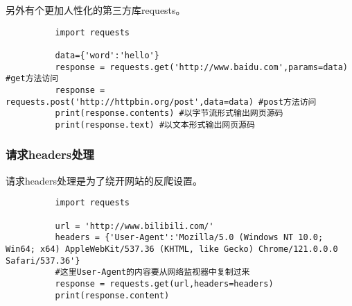 \documentclass{article}
\begin{document}
        另外有个更加人性化的第三方库requests。
        \begin{lstlisting}
          import requests

          data={'word':'hello'}
          response = requests.get('http://www.baidu.com',params=data) #get方法访问
          response = requests.post('http://httpbin.org/post',data=data) #post方法访问
          print(response.contents) #以字节流形式输出网页源码
          print(response.text) #以文本形式输出网页源码
        \end{lstlisting}

      \subsubsection{请求headers处理}
        请求headers处理是为了绕开网站的反爬设置。
        \begin{lstlisting}
          import requests

          url = 'http://www.bilibili.com/'
          headers = {'User-Agent':'Mozilla/5.0 (Windows NT 10.0; Win64; x64) AppleWebKit/537.36 (KHTML, like Gecko) Chrome/121.0.0.0 Safari/537.36'}
          #这里User-Agent的内容要从网络监视器中复制过来
          response = requests.get(url,headers=headers)
          print(response.content)
        \end{lstlisting}
\end{document}
